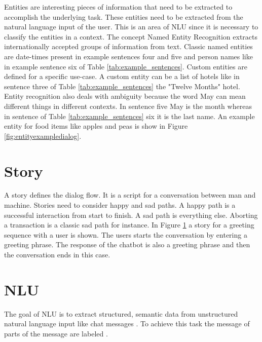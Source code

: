 \documentclass[12pt, backref]{report}
\newcommand{\makefigure}[2] {
\begin{figure}[h]
	\centering
	\fbox{\texttt{[image: \#1.PNG]}}
	\captionof{figure}{#2}\label{fig:#1}
\end{figure}
}
\begin{document}
Entities are interesting pieces of information that need to be extracted to accomplish the underlying task.
These entities need to be extracted from the natural language input of the user.
This is an area of NLU since it is necessary to classify the entities in a context.
The concept Named Entity Recognition extracts internationally accepted groups of information from text.
Classic named entities are date-times present in example sentences four and five and person names like in example sentence six of Table \ref{tab:example_sentences}.
Custom entities are defined for a specific use-case. A custom entity can be a list of hotels like in sentence three of Table \ref{tab:example_sentences} the "Twelve Months" hotel.
Entity recognition also deals with ambiguity because the word May can mean different things in different contexts.
In sentence five May is the month whereas in sentence of Table \ref{tab:example_sentences} six it is the last name. 
An example entity for food items like apples and peas is show in Figure \ref{fig:entityexampledialog}.

\section{Story}
A story defines the dialog flow. It is a script for a conversation between man and machine.
Stories need to consider happy and sad paths. A happy path is a successful interaction from start to finish.
A sad path is everything else. Aborting a transaction is a classic sad path for instance. In Figure \ref{fig:greetstory} a story for a greeting sequence with a user is shown. The users starts the conversation by entering a greeting phrase. The response of the chatbot is also a greeting phrase and then the conversation ends in this case. 
\makefigure{greetstory}{Greeting Story}

\section{NLU}
The goal of NLU is to extract structured, semantic data from unstructured natural language input like chat messages \cite{braunEvaluatingNLU}.
To achieve this task the message of parts of the message are labeled \cite{braunEvaluatingNLU}.
\end{document}
